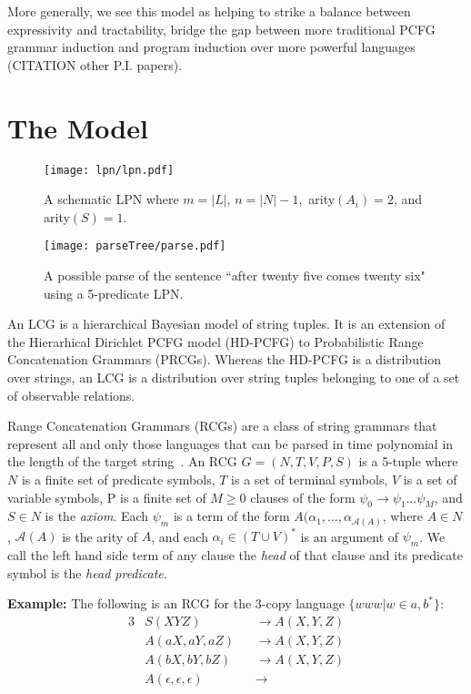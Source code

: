 \documentclass[11pt, twocolumn]{article}
\begin{document}
More generally, we see this model as helping to strike a balance between expressivity and tractability, bridge the gap between more traditional PCFG grammar induction and program induction over more powerful languages~\cite{dechter2013bootstrap,} (CITATION other P.I. papers).

\section{The Model}

\begin{figure}[t]
		\texttt{[image: lpn/lpn.pdf]}
		\caption{A schematic LPN where $m = |L|,\, n = |N|-1$,\, arity$(A_i) = 2$, and arity$(S) = 1$.}
		\label{fig:schematic}
\end{figure}

\begin{figure}[t]
		\texttt{[image: parseTree/parse.pdf]}
		\caption{A possible parse of the sentence ``after twenty five comes twenty six" using a 5-predicate LPN.}
\end{figure}


An LCG is a hierarchical Bayesian model of string tuples. It is an
extension of the Hierarhical Dirichlet PCFG model (HD-PCFG) to
Probabilistic Range Concatenation Grammars (PRCGs). Whereas the
HD-PCFG is a distribution over strings, an LCG is a distribution over
string tuples belonging to one of a set of observable
relations. 

Range Concatenation Grammars (RCGs) are a class of string grammars
that represent all and only those languages that can be parsed in time
polynomial in the length of the target
string~\cite{boullier2005range}. An RCG $G=(N, T, V, P, S)$ is a
5-tuple where $N$ is a finite set of predicate symbols, $T$ is a set
of terminal symbols, $V$ is a set of variable symbols, P is a finite
set of $M \geq 0$ clauses of the form $\psi_0 \rightarrow \psi_1 \dots
\psi_M$, and $S \in N$ is the \emph{axiom}. Each $\psi_m$ is a term of
the form $A(\alpha_1, \dots, \alpha_{\mathcal{A}(A)}$, where $A \in
N$, $\mathcal{A}(A)$ is the arity of $A$, and each $\alpha_i \in (T
\cup V)^*$ is an argument of $\psi_m$. We call the left hand side term
of any clause the \emph{head} of that clause and its predicate symbol
is the \emph{head predicate}.

\textbf{Example:} The following is an RCG for the 3-copy language
$\{www | w \in {a, b}^*\}$:
\begin{alignat*}{3}
&S(XYZ) &&\rightarrow A(X, Y, Z)\\
&A(aX, aY, aZ) &&\rightarrow A(X, Y, Z)\\
&A(bX, bY, bZ) &&\rightarrow A(X, Y, Z)\\
&A(\epsilon, \epsilon, \epsilon) &&\rightarrow 
\end{alignat*}
\end{document}
